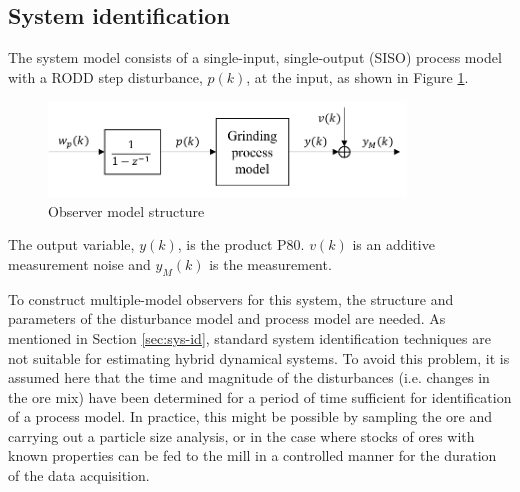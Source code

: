 \subsection{System identification} \label{sec:grind1-sysid}

The system model consists of a single-input, single-output (SISO) process model with a RODD step disturbance, $p(k)$, at the input, as shown in Figure \ref{fig:grind1_obs_model}.
\begin{figure}[ht]
	\centering
	\includegraphics[width=9.5cm]{images/grind1-obs-model-diag.pdf}
	\caption{Observer model structure}
	\label{fig:grind1_obs_model}
\end{figure}
The output variable, $y(k)$, is the product P80. $v(k)$ is an additive measurement noise and $y_M(k)$ is the measurement.

To construct multiple-model observers for this system, the structure and parameters of the disturbance model and process model are needed. As mentioned in Section \ref{sec:sys-id}, standard system identification techniques are not suitable for estimating hybrid dynamical systems. To avoid this problem, it is assumed here that the time and magnitude of the disturbances (i.e. changes in the ore mix) have been determined for a period of time sufficient for identification of a process model. In practice, this might be possible by sampling the ore and carrying out a particle size analysis, or in the case where stocks of ores with known properties can be fed to the mill in a controlled manner for the duration of the data acquisition.

